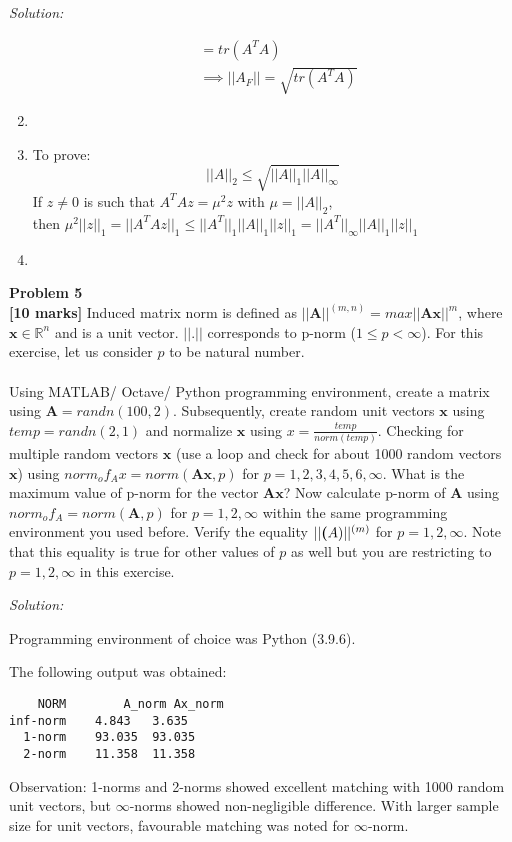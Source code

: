 \documentclass[fleqn]{article}
\newenvironment{problem}[2][Problem]
    { \begin{mdframed}[backgroundcolor=gray!20] \textbf{#1 #2} \\}
    {  \end{mdframed}}
\newenvironment{solution}
    {\textit{Solution:}}
    {}
\begin{document}
\begin{solution}
\begin{enumerate}[label=(\alph*)]
\begin{equation*}
\begin{split}
                &= tr(A^{T}A)\\
                &\implies ||A_F|| = \sqrt{tr(A^{T}A)}
            \end{split}
        \end{equation*}
        \item
        \item To prove:
        \begin{equation*}
            || A||_{2} \leq \sqrt{||A||_{1} ||A||_{\infty}}
        \end{equation*}
        If $z \neq 0$ is such that $A^{T}Az = \mu^{2}z$ with $\mu = ||A||_{2}$,\\
         then $\mu^{2}||z||_{1} = || A^T A z ||_1 \leq ||A^{T}||_{1} ||A||_{1} ||z||_{1} = ||A^{T}||_{\infty} ||A||_{1} ||z||_{1}$
        \item
    \end{enumerate}
\end{solution}

\newpage
\begin{problem}{5}
\textbf{[10 marks]} Induced matrix norm is defined as $||\textbf{A}||^{(m,n)} = max|| \textbf{Ax}||^{m}$, where $\textbf{x} \in \mathbb{R}^n$ and is a unit vector. $||.||$ corresponds to p-norm ($1 \leq p < \infty$). For this exercise, let us consider $p$ to be natural number.\\\\
Using MATLAB/ Octave/ Python programming environment, create a matrix using $\textbf{A} = randn(100,2)$. Subsequently, create random unit vectors $\textbf{x}$ using $temp = randn(2,1)$ and normalize $\textbf{x}$ using $x =\frac{temp}{norm(temp)}$. Checking for multiple random vectors $\textbf{x}$ (use a loop and check for about 1000 random vectors $\textbf{x}$) using $norm_of_Ax = norm(\textbf{Ax}, p)$ for $p = 1,2,3,4,5,6,\infty$. What is the maximum value of p-norm for the vector $\textbf{Ax}$? Now calculate p-norm of $\textbf{A}$ using $norm_of_A = norm(\textbf{A},p)$ for $p = 1,2, \infty$ within the same programming environment you used before. Verify the equality $|| \textbf(A)||^{(m)}$ for $p = 1,2,\infty$. Note that this equality is true for other values of $p$ as well but you are restricting to $p = 1,2,\infty$ in this exercise.
\end{problem}
\begin{solution}

    Programming environment of choice was Python (3.9.6).

The following output was obtained:
\begin{verbatim}
    NORM 		A_norm Ax_norm
inf-norm	4.843	3.635
  1-norm	93.035	93.035
  2-norm	11.358	11.358
\end{verbatim}
Observation: 1-norms and 2-norms showed excellent matching with 1000 random unit vectors, but $\infty$-norms showed non-negligible difference. With larger sample size for unit vectors, favourable matching was noted for $\infty$-norm.
\end{solution}
\end{document}
